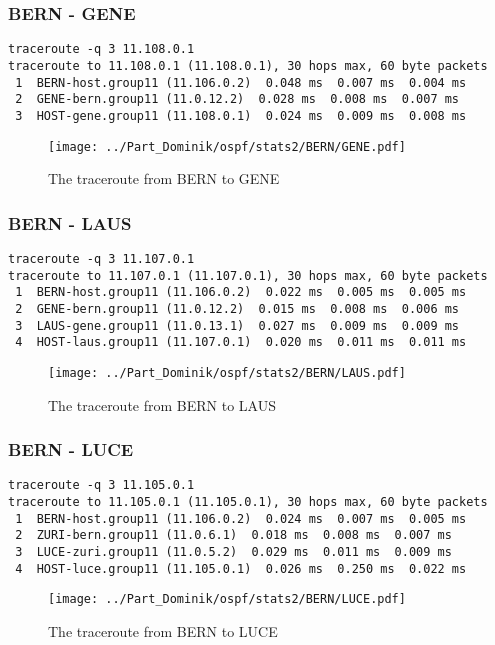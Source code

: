 \clearpage
\subsubsection{BERN - GENE}
\begin{lstlisting}
traceroute -q 3 11.108.0.1
traceroute to 11.108.0.1 (11.108.0.1), 30 hops max, 60 byte packets
 1  BERN-host.group11 (11.106.0.2)  0.048 ms  0.007 ms  0.004 ms
 2  GENE-bern.group11 (11.0.12.2)  0.028 ms  0.008 ms  0.007 ms
 3  HOST-gene.group11 (11.108.0.1)  0.024 ms  0.009 ms  0.008 ms
\end{lstlisting}
\begin{figure}[H]
\centering
\texttt{[image: ../Part\_Dominik/ospf/stats2/BERN/GENE.pdf]}
\caption{The traceroute from BERN to GENE}
\end{figure}
\clearpage
\subsubsection{BERN - LAUS}
\begin{lstlisting}
traceroute -q 3 11.107.0.1
traceroute to 11.107.0.1 (11.107.0.1), 30 hops max, 60 byte packets
 1  BERN-host.group11 (11.106.0.2)  0.022 ms  0.005 ms  0.005 ms
 2  GENE-bern.group11 (11.0.12.2)  0.015 ms  0.008 ms  0.006 ms
 3  LAUS-gene.group11 (11.0.13.1)  0.027 ms  0.009 ms  0.009 ms
 4  HOST-laus.group11 (11.107.0.1)  0.020 ms  0.011 ms  0.011 ms
\end{lstlisting}
\begin{figure}[H]
\centering
\texttt{[image: ../Part\_Dominik/ospf/stats2/BERN/LAUS.pdf]}
\caption{The traceroute from BERN to LAUS}
\end{figure}
\clearpage
\subsubsection{BERN - LUCE}
\begin{lstlisting}
traceroute -q 3 11.105.0.1
traceroute to 11.105.0.1 (11.105.0.1), 30 hops max, 60 byte packets
 1  BERN-host.group11 (11.106.0.2)  0.024 ms  0.007 ms  0.005 ms
 2  ZURI-bern.group11 (11.0.6.1)  0.018 ms  0.008 ms  0.007 ms
 3  LUCE-zuri.group11 (11.0.5.2)  0.029 ms  0.011 ms  0.009 ms
 4  HOST-luce.group11 (11.105.0.1)  0.026 ms  0.250 ms  0.022 ms
\end{lstlisting}
\begin{figure}[H]
\centering
\texttt{[image: ../Part\_Dominik/ospf/stats2/BERN/LUCE.pdf]}
\caption{The traceroute from BERN to LUCE}
\end{figure}
\clearpage
